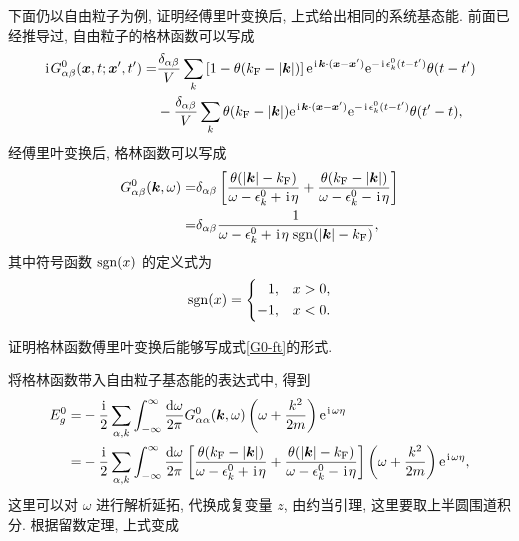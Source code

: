 下面仍以自由粒子为例, 证明经傅里叶变换后, 上式给出相同的系统基态能. 前面已经推导过, 自由粒子的格林函数可以写成
\begin{align}
        \hspace{0.1em}\mathrm{i}\hspace{0.1em} G_{\alpha\beta}^{0}(\boldsymbol{x},t;\boldsymbol{x}',t')=&\frac{\delta_{\alpha\beta}}{V}\sum_k\left[ 1-\theta(k_{\mathrm{F}}-|\boldsymbol{k}|) \right] \mathrm{e}^{\hspace{0.1em}\mathrm{i}\hspace{0.1em}\boldsymbol{k}\cdot(\boldsymbol{x}-\boldsymbol{x}')}\mathrm{e}^{-\hspace{0.1em}\mathrm{i}\hspace{0.1em}\epsilon_k^0(t-t')}\theta(t-t')\nonumber\\
        &-\frac{\delta_{\alpha\beta}}{V}\sum_k\theta(k_{\mathrm{F}}-|\boldsymbol{k}|)\mathrm{e}^{\hspace{0.1em}\mathrm{i}\hspace{0.1em}\boldsymbol{k}\cdot(\boldsymbol{x}-\boldsymbol{x}')}\mathrm{e}^{-\hspace{0.1em}\mathrm{i}\hspace{0.1em}\epsilon_k^0(t-t')}\theta(t'-t),
    \end{align}
经傅里叶变换后, 格林函数可以写成
 \begin{align}\label{G0-ft}
        G_{\alpha\beta}^{0}(\boldsymbol{k},\omega)=&\delta_{\alpha\beta}\left[ \frac{\theta(|\boldsymbol{k}|-k_{\mathrm{F}})}{\omega-\epsilon_k^0+\hspace{0.1em}\mathrm{i}\hspace{0.1em}\eta}+\frac{\theta(k_{\mathrm{F}}-|\boldsymbol{k}|)}{\omega-\epsilon_k^0-\hspace{0.1em}\mathrm{i}\hspace{0.1em}\eta} \right]\nonumber\\
        =&\delta_{\alpha\beta}\frac{1}{\omega-\epsilon_k^0+\hspace{0.1em}\mathrm{i}\hspace{0.1em}\eta\;\mathrm{sgn}(|\boldsymbol{k}|-k_{\mathrm{F}})},
    \end{align}
其中符号函数 $\mathrm{sgn}(x)$ 的定义式为
\begin{equation}
    \mathrm{sgn}(x)=\left\{ \begin{aligned}
        1,& \quad x>0,\\
        -1,& \quad x<0.
    \end{aligned} \right.
\end{equation}
\begin{question}{}{}
    证明格林函数傅里叶变换后能够写成式\eqref{G0-ft}的形式.
\end{question}
将格林函数带入自由粒子基态能的表达式中, 得到
 \begin{align}
        E_g^0=&-\frac{\hspace{0.1em}\mathrm{i}\hspace{0.1em}}{2}\sum_{\alpha,k}\int_{-\infty}^{\infty}\frac{\mathrm{d}\omega}{2\pi}G_{\alpha\alpha}^{0}(\boldsymbol{k},\omega)\left( \omega+\frac{k^2}{2m} \right)\mathrm{e}^{\hspace{0.1em}\mathrm{i}\hspace{0.1em}\omega\eta}\nonumber\\
        =&-\frac{\hspace{0.1em}\mathrm{i}\hspace{0.1em}}{2}\sum_{\alpha,k}\int_{-\infty}^{\infty}\frac{\mathrm{d}\omega}{2\pi}\left[ \frac{\theta(k_{\mathrm{F}}-|\boldsymbol{k}|)}{\omega-\epsilon_k^0+\hspace{0.1em}\mathrm{i}\hspace{0.1em}\eta}+\frac{\theta(|\boldsymbol{k}|-k_{\mathrm{F}})}{\omega-\epsilon_k^0-\hspace{0.1em}\mathrm{i}\hspace{0.1em}\eta} \right] \left( \omega+\frac{k^2}{2m} \right) \mathrm{e}^{\hspace{0.1em}\mathrm{i}\hspace{0.1em}\omega\eta},
    \end{align}
这里可以对 $\omega$ 进行解析延拓, 代换成复变量 $z$, 由约当引理, 这里要取上半圆围道积分. 根据留数定理, 上式变成
